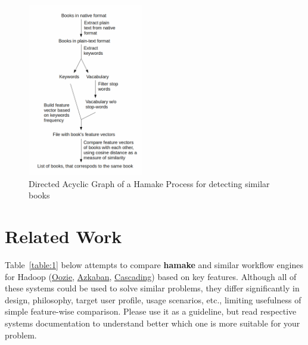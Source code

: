 \documentclass[10pt,conference,letterpaper]{IEEEtran}
\begin{document}
\begin{figure}[htp]
\centering
\includegraphics[width=0.45\textwidth]{SimilarityAlgDAG.png}
\caption{Directed Acyclic Graph of a Hamake Process for detecting similar books}
\label{fig:SimilarityAlgDAG}
\end{figure}

\section{Related Work}

Table~\ref{table:1} below attempts to compare \textbf{hamake} and
similar workflow engines for Hadoop
(\href{http://github.com/tucu00/oozie1}{Oozie},
\href{http://sna-projects.com/azkaban/}{Azkaban},
\href{http://www.cascading.org/}{Cascading}) based on key
features. Although all of these systems could be used to solve similar
problems, they differ significantly in design, philosophy, target user
profile, usage scenarios, etc., limiting usefulness of simple
feature-wise comparison. Please use it as a guideline, but read
respective systems documentation to understand better which one is
more suitable for your problem.
\end{document}
